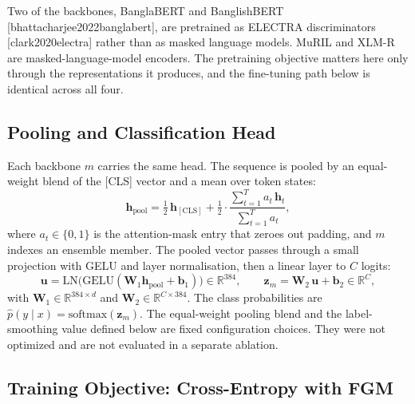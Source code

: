 \documentclass[11pt,a4paper]{article}
\def\citep#1{[#1]}%
\def\texttt#1{#1}%
\begin{document}
Two of the backbones, BanglaBERT and BanglishBERT \citep{bhattacharjee2022banglabert}, are pretrained as ELECTRA discriminators \citep{clark2020electra} rather than as masked language models. MuRIL and XLM-R are masked-language-model encoders. The pretraining objective matters here only through the representations it produces, and the fine-tuning path below is identical across all four.

\subsection{Pooling and Classification Head}
\label{sec:head}

Each backbone $m$ carries the same head. The sequence is pooled by an equal-weight blend of the \texttt{[CLS]} vector and a mean over token states:
\begin{equation}
\mathbf{h}_{\mathrm{pool}} = \tfrac{1}{2}\,\mathbf{h}_{[\mathrm{CLS}]} + \tfrac{1}{2}\cdot\frac{\sum_{t=1}^{T} a_t\,\mathbf{h}_t}{\sum_{t=1}^{T} a_t},
\label{eq:pool}
\end{equation}
where $a_t \in \{0,1\}$ is the attention-mask entry that zeroes out padding, and $m$ indexes an ensemble member. The pooled vector passes through a small projection with GELU and layer normalisation, then a linear layer to $C$ logits:
\begin{equation}
\mathbf{u} = \mathrm{LN}\!\big(\mathrm{GELU}(\mathbf{W}_1 \mathbf{h}_{\mathrm{pool}} + \mathbf{b}_1)\big) \in \mathbb{R}^{384},
\qquad
\mathbf{z}_m = \mathbf{W}_2\,\mathbf{u} + \mathbf{b}_2 \in \mathbb{R}^{C},
\label{eq:head}
\end{equation}
with $\mathbf{W}_1 \in \mathbb{R}^{384 \times d}$ and $\mathbf{W}_2 \in \mathbb{R}^{C \times 384}$. The class probabilities are $\hat{p}(y \mid x) = \mathrm{softmax}(\mathbf{z}_m)$. The equal-weight pooling blend and the label-smoothing value defined below are fixed configuration choices. They were not optimized and are not evaluated in a separate ablation.

\subsection{Training Objective: Cross-Entropy with FGM}
\label{sec:objective}
\end{document}
